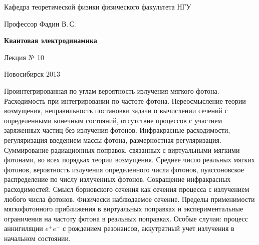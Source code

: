\documentclass[12pt,pagesize,paper=192mm:108mm]{scrbook}
\begin{document}
\begin{titlepage}
\begin{center}
    Кафедра теоретической физики физического факультета НГУ
    \medskip

    \Large
    Профессор Фадин В.\,С.
    \bigskip

    \huge
    \textbf{Квантовая электродинамика}
    \bigskip

    \Large
    Лекция № 10
    \vfill

    \normalsize
    \vfill

    \normalsize \ccbysa\hspace{0.5em}  Новосибирск 2013
  \end{center}
\end{titlepage}
\vspace*{-1em}
\begin{center}
\vfill
  \begin{minipage}{0.8\linewidth}
    Проинтегрированная по углам вероятность излучения мягкого
    фотона. Расходимость при интегрировании по частоте
    фотона. Переосмысление теории возмущения, неправильность
    постановки задачи о вычислении сечений с определенными конечным
    состояний, отсутствие процессов с участием заряженных частиц без
    излучения фотонов. Инфракрасные расходимости, регуляризация
    введением массы фотона, размерностная регуляризация.  Суммирование
    радиационных поправок, связанных с виртуальными мягкими фотонами,
    во всех порядках теории возмущения. Среднее число реальных мягких
    фотонов, вероятность излучения определенного числа фотонов,
    пуассоновское распределение по числу излученных
    фотонов. Сокращение инфракрасных расходимостей. Смысл борновского
    сечения как сечения процесса с излучением любого числа
    фотонов. Физически наблюдаемое сечение. Пределы применимости
    мягкофотонного приближения в виртуальных поправках и
    экспериментальные ограничения на частоту фотона в реальных
    поправках. Особые случаи: процесс аннигиляции $e^+e^-$ с рождением
    резонансов, аккутратный учет излучения в начальном состоянии.
  \end{minipage}
  \vfill

\end{center}
\end{document}
